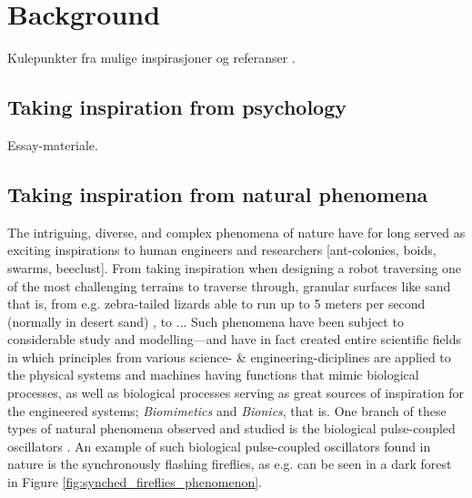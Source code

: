 \chapter{Background}
\label{chap:background}
Kulepunkter  fra mulige inspirasjoner og referanser .




\section{Taking inspiration from psychology}

Essay-materiale.





\section{Taking inspiration from natural phenomena}
The intriguing, diverse, and complex phenomena of nature have for long served as exciting inspirations to human engineers and researchers [ant-colonies, boids, swarms, beeclust]. From taking inspiration when designing a robot traversing one of the most challenging terrains to traverse through, granular surfaces like sand that is, from e.g. zebra-tailed lizards able to run up to 5 meters per second (normally in desert sand) \cite{sandbots}, to ... Such phenomena have been subject to considerable study and modelling—and have in fact created entire scientific fields \cite{biomimetics, bionics} in which principles from various science- \& engineering-diciplines are applied to the physical systems and machines having functions that mimic biological processes, as well as biological processes serving as great sources of inspiration for the engineered systems; \textit{Biomimetics} and \textit{Bionics}, that is. One branch of these types of natural phenomena observed and studied is the biological pulse-coupled oscillators \cite{russerMinimalAssumptionsReferanser}. An example of such biological pulse-coupled oscillators found in nature is the synchronously flashing fireflies, as e.g. can be seen in a dark forest in Figure \ref{fig:synched_fireflies_phenomenon}.

